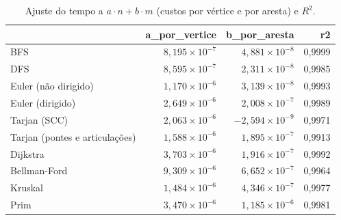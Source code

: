 \begin{table}[htbp]
\centering
\small
\caption{Ajuste do tempo a $a \cdot n + b \cdot m$ (custos por vértice e por aresta) e $R^2$.}
\label{tab:04_ajuste_n_m}
\begin{tabular}{lrrr}
\toprule
 & a\_por\_vertice & b\_por\_aresta & r2 \\
\midrule
BFS & $8,195 \times 10^{-7}$ & $4,881 \times 10^{-8}$ & 0,9999 \\
DFS & $8,595 \times 10^{-7}$ & $2,311 \times 10^{-8}$ & 0,9985 \\
Euler (não dirigido) & $1,170 \times 10^{-6}$ & $3,139 \times 10^{-8}$ & 0,9993 \\
Euler (dirigido) & $2,649 \times 10^{-6}$ & $2,008 \times 10^{-7}$ & 0,9989 \\
Tarjan (SCC) & $2,063 \times 10^{-6}$ & $-2,594 \times 10^{-9}$ & 0,9971 \\
Tarjan (pontes e articulações) & $1,588 \times 10^{-6}$ & $1,895 \times 10^{-7}$ & 0,9913 \\
Dijkstra & $3,703 \times 10^{-6}$ & $1,916 \times 10^{-7}$ & 0,9992 \\
Bellman-Ford & $9,309 \times 10^{-6}$ & $6,652 \times 10^{-7}$ & 0,9964 \\
Kruskal & $1,484 \times 10^{-6}$ & $4,346 \times 10^{-7}$ & 0,9977 \\
Prim & $3,470 \times 10^{-6}$ & $1,185 \times 10^{-6}$ & 0,9981 \\
\bottomrule
\end{tabular}
\end{table}
